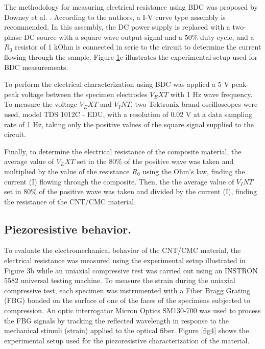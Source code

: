 \documentclass[twocolumn]{bmcart}%
\begin{document}
The methodology for measuring electrical resistance using BDC was proposed by  Downey et al. \cite{Downey2017a}. According to the authors, a I-V curve type assembly is recommended. In this assembly, the DC power supply is replaced with a two-phase DC source with a square wave output signal and a $50\%$ duty cycle, and a $R_0$ resistor of 1 kOhm is connected in serie to the circuit to determine the current flowing through the sample. Figure \ref{fig3}c illustrates the experimental setup used for BDC measurements.

To perform the electrical characterization using BDC was applied a 5 V peak-peak voltage between the specimen electrodes $V_EXT$ with 1 Hz wave frequency. To measure the voltage $V_EXT$ and $V_INT$, two Tektronix brand oscilloscopes were used, model TDS 1012C - EDU, with a resolution of 0.02 V at a data sampling rate of 1 Hz, taking only the positive values of the square signal supplied to the circuit.

Finally, to determine the electrical resistance of the composite material, the average value of $V_EXT$ set in the $80\%$ of the positive wave was taken and multiplied by the value of the resistance $R_0$ using the Ohm's law, finding the current (I) flowing through the composite. Then, the the average value of $V_INT$ set in $80\%$ of the positive wave was taken and divided by the current (I), finding the resistance of the CNT/CMC material.

\begin{figure}[h!]
  \caption{
      }
  \label{fig3}
      \end{figure}


\subsection{Piezoresistive behavior.}

To evaluate the electromechanical behavior of the CNT/CMC material, the electrical resistance was measured using the experimental setup illustrated in Figure 3b while an uniaxial compressive test was carried out using an INSTRON 5582 universal testing machine. To measure the strain during the uniaxial compressive test, each specimen was instrumented with a Fiber Bragg Grating (FBG) bonded on the surface of one of the faces of the specimens subjected to compression. An optic interrogator Micron Optics SM130-700 was used to process the FBG signals by tracking the reflected wavelength in response to the mechanical stimuli (strain) applied to the optical fiber. Figure \ref{fig4} shows the experimental setup used for the piezoresistive characterization of the material. 
\end{document}
